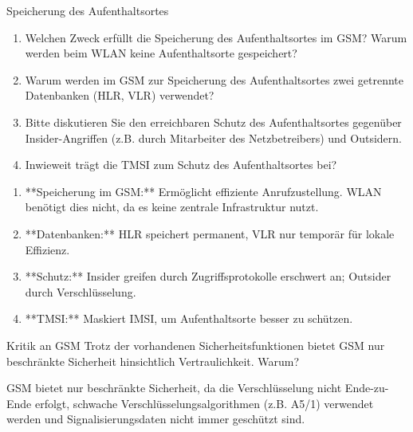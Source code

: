 \documentclass{article}
\begin{document}
\setcounter{subsection}{2220}
\begin{exercise}{Speicherung des Aufenthaltsortes}
  \begin{enumerate}
    \item Welchen Zweck erfüllt die Speicherung des Aufenthaltsortes im GSM? Warum werden beim WLAN keine Aufenthaltsorte gespeichert?
    \item Warum werden im GSM zur Speicherung des Aufenthaltsortes zwei getrennte Datenbanken (HLR, VLR) verwendet?
    \item Bitte diskutieren Sie den erreichbaren Schutz des Aufenthaltsortes gegenüber Insider-Angriffen (z.B. durch Mitarbeiter des Netzbetreibers) und Outsidern.
    \item Inwieweit trägt die TMSI zum Schutz des Aufenthaltsortes bei?
  \end{enumerate}

  \begin{solution}
    \begin{enumerate}
      \item **Speicherung im GSM:** Ermöglicht effiziente Anrufzustellung. WLAN benötigt dies nicht, da es keine zentrale Infrastruktur nutzt.
      \item **Datenbanken:** HLR speichert permanent, VLR nur temporär für lokale Effizienz.
      \item **Schutz:** Insider greifen durch Zugriffsprotokolle erschwert an; Outsider durch Verschlüsselung.
      \item **TMSI:** Maskiert IMSI, um Aufenthaltsorte besser zu schützen.
    \end{enumerate}
  \end{solution}
\end{exercise}

\setcounter{subsection}{2223}
\begin{exercise}{Kritik an GSM}
  Trotz der vorhandenen Sicherheitsfunktionen bietet GSM nur beschränkte Sicherheit hinsichtlich Vertraulichkeit. Warum?

  \begin{solution}
    GSM bietet nur beschränkte Sicherheit, da die Verschlüsselung nicht Ende-zu-Ende erfolgt, schwache Verschlüsselungsalgorithmen (z.B. A5/1) verwendet werden und Signalisierungsdaten nicht immer geschützt sind.
  \end{solution}
\end{exercise}
\end{document}
